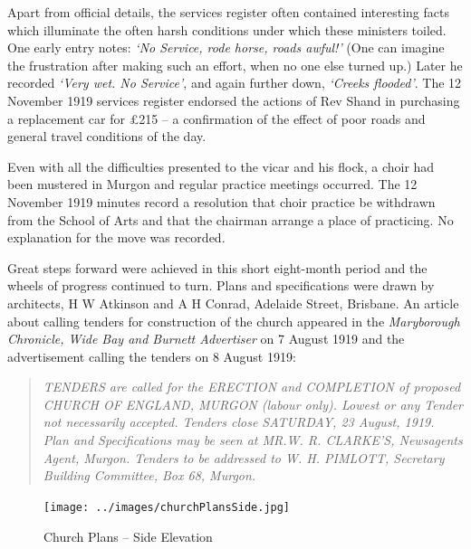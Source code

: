 Apart from official details, the services register often contained interesting facts which illuminate the often harsh conditions under which these ministers toiled. One early entry notes: \emph{`No Service, rode horse, roads awful!'} (One can imagine the frustration after making such an effort, when no one else turned up.) Later he recorded \emph{`Very wet. No Service'}, and again further down, \emph{`Creeks flooded'}. The 12 November 1919 services register endorsed the actions of Rev Shand in purchasing a replacement car for \pounds215 -- a confirmation of the effect of poor roads and general travel conditions of the day.



Even with all the difficulties presented to the vicar and his flock, a choir had been mustered in Murgon and regular practice meetings occurred. The 12 November 1919 minutes record a resolution that choir practice be withdrawn from the School of Arts and that the chairman arrange a place of practicing. No explanation for the move was recorded.



Great steps forward were achieved in this short eight-month period and the wheels of progress continued to turn. Plans and specifications were drawn by architects, H W Atkinson and A H Conrad, Adelaide Street, Brisbane. An article about calling tenders for construction of the church appeared in the \emph{Maryborough Chronicle, Wide Bay and Burnett Advertiser} on 7 August 1919 and the advertisement calling the tenders on 8 August 1919:



\begin{quote}

\emph{TENDERS are called for the ERECTION and COMPLETION of proposed CHURCH OF ENGLAND, MURGON (labour only). Lowest or any Tender not necessarily accepted. Tenders close SATURDAY, 23 August, 1919. Plan and Specifications may be seen at MR.W. R. CLARKE'S, Newsagents Agent, Murgon. Tenders to be addressed to W. H. PIMLOTT, Secretary Building Committee, Box 68, Murgon.}

\end{quote}









\begin{figure}
\begin{center}
\texttt{[image: ../images/churchPlansSide.jpg]}
\caption{Church Plans -- Side Elevation}
\end{center}
\end{figure}










